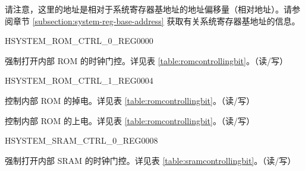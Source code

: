 请注意，这里的地址是相对于系统寄存器基地址的地址偏移量（相对地址）。请参阅章节 \ref{subsection:system-reg-base-address} 获取有关系统寄存器基地址的信息。

\begin{register}{H}{SYSTEM\_ROM\_CTRL\_0\_REG}{\hexprefix{}0000}\label{regdesc:SYSTEMROMCTRL0REG}
%
%
\regnewline%
\begin{regdesc}\begin{reglist}
\label{fielddesc:SYSTEMROMFO}\item [SYSTEM\_ROM\_FO] 强制打开内部 ROM 的时钟门控。详见表 \ref{table:romcontrollingbit}。（读/写）

\end{reglist}\end{regdesc}
\end{register}

\begin{register}{H}{SYSTEM\_ROM\_CTRL\_1\_REG}{\hexprefix{}0004}\label{regdesc:SYSTEMROMCTRL1REG}
%
%
%
\regnewline%
\begin{regdesc}\begin{reglist}
\label{fielddesc:SYSTEMROMFORCEPD}\item [SYSTEM\_ROM\_FORCE\_PD] 控制内部 ROM 的掉电。详见表 \ref{table:romcontrollingbit}。（读/写）
\label{fielddesc:SYSTEMROMFORCEPU}\item [SYSTEM\_ROM\_FORCE\_PU] 控制内部 ROM 的上电。详见表 \ref{table:romcontrollingbit}。（读/写）

\end{reglist}\end{regdesc}
\end{register}


\begin{register}{H}{SYSTEM\_SRAM\_CTRL\_0\_REG}{\hexprefix{}0008}\label{regdesc:SYSTEMSRAMCTRL0REG}
%
%
\regnewline%
\begin{regdesc}\begin{reglist}
\label{fielddesc:SYSTEMSRAMFO}\item [SYSTEM\_SRAM\_FO] 强制打开内部 SRAM 的时钟门控。详见表 \ref{table:sramcontrollingbit}。（读/写）

\end{reglist}\end{regdesc}
\end{register}

